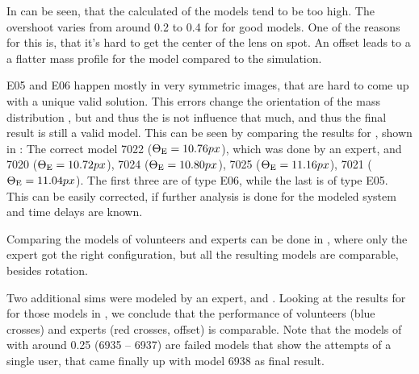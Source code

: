 In  can be seen, that the calculated \ERf of the models tend to be too high.
The overshoot varies from around 0.2 to 0.4 for for good models.
One of the reasons for this is, that it's hard to get the center of the lens on spot.
An offset leads to a a flatter mass profile for the model compared to the simulation.





E05 and E06 happen mostly in very symmetric images, that are hard to come up with a unique valid solution.
This errors change the orientation of the mass distribution \kap[x,y],
but \kenc and thus the \ERf is not influence that much, and thus the final result is still a valid model.
This can be seen by comparing the results for , shown in : 
The correct model 7022 ($\Theta_\text{E}=10.76px$), which was done by an expert, and
7020 ($\Theta_\text{E}=10.72px$),
7024 ($\Theta_\text{E}=10.80px$),
7025 ($\Theta_\text{E}=11.16px$),
7021 ($\Theta_\text{E}=11.04px$).
The first three are of type E06, while the last is of type E05.
This can be easily corrected, if further analysis is done for the modeled system and time delays are known.


Comparing the models of volunteers and experts can be done in , where only the
expert got the right configuration, but all the resulting models are comparable, besides rotation.

Two additional sims were modeled by an expert,  and .
Looking at the results for \ERg for those models in , we conclude that the performance of volunteers (blue crosses) and experts (red crosses, offset) is comparable.
Note that the models of  with \ERg[, rel] around 0.25 (6935 -- 6937) are failed models that show the attempts of a single user, that came finally up with model 6938 as final result.

\clearpage
